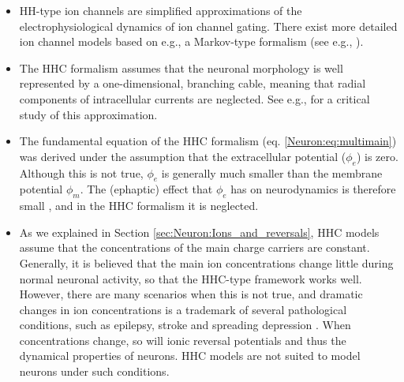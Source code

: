 \begin{itemize}
\item HH-type ion channels are simplified approximations of the electrophysiological dynamics of ion channel gating. There exist more detailed ion channel models based on e.g., a Markov-type formalism (see e.g., \cite{Destexhe1994, balbi2017}). 

\item The HHC formalism assumes that the neuronal morphology is well represented by a one-dimensional, branching cable, meaning that radial components of intracellular currents are neglected. See e.g.,\cite{lindsay2004maxwell} for a critical study of this approximation.

\item The fundamental equation of the HHC formalism (eq. \ref{Neuron:eq:multimain}) was derived under the assumption that the extracellular potential ($\phi_e$) is zero. Although this is not true, $\phi_e$ is generally much smaller than the membrane potential $\phi_m$. The (ephaptic) effect  that $\phi_e$ has on neurodynamics is therefore small \cite{anastassiou2015}, and in the HHC formalism it is neglected.

\item As we explained in Section \ref{sec:Neuron:Ions_and_reversals}, HHC models assume that the concentrations of the main charge carriers are constant. Generally, it is believed that the main ion concentrations change little during normal neuronal activity, so that the HHC-type framework works well. However, there are many scenarios when this is not true, and dramatic changes in ion concentrations is a trademark of several pathological conditions, such as epilepsy, stroke and spreading depression \cite{Somjen2001, Zandt2015, Ayata2015}. When concentrations change, so will ionic reversal potentials and thus the dynamical properties of neurons. HHC models are not suited to model neurons under such conditions.

\end{itemize}

